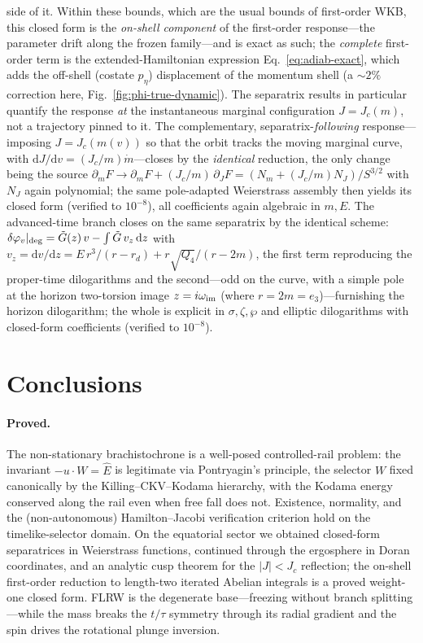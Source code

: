 \documentclass[12pt]{iopart}
\newcommand{\Ehat}{\hat E}
\newcommand{\Jc}{J_{c}}
\newcommand{\dd}{\mathrm{d}}
\begin{document}
side of it. Within these bounds, which
are the usual bounds of first-order WKB, this closed form is the \emph{on-shell
component} of the first-order response---the parameter drift along the frozen
family---and is exact as such; the \emph{complete} first-order term is the
extended-Hamiltonian expression Eq.~\eqref{eq:adiab-exact}, which adds the
off-shell (costate $p_\eta$) displacement of the momentum shell (a $\sim2\%$
correction here, Fig.~\ref{fig:phi-true-dynamic}). The separatrix
results in particular quantify the response \emph{at} the instantaneous marginal
configuration $J=\Jc(m)$, not a trajectory pinned to it. The complementary,
separatrix-\emph{following} response---imposing $J=\Jc(m(v))$ so that the orbit
tracks the moving marginal curve, with $\dd J/\dd v=(\Jc/m)\dot m$---closes by the
\emph{identical} reduction, the only change being the source $\partial_m F\to
\partial_m F+(\Jc/m)\,\partial_J F=(N_m+(\Jc/m)N_J)/S^{3/2}$ with $N_J$ again
polynomial; the same pole-adapted Weierstrass assembly then yields its closed form
(verified to $10^{-8}$), all coefficients again algebraic in $m,E$. The
advanced-time branch closes on the same separatrix by the identical scheme:
$\delta\varphi_v|_{\rm deg}=\tilde G(z)\,v-\int\tilde G\,v_z\,\dd z$ with
$v_z=\dd v/\dd z=E\,r^3/(r-r_d)+r\sqrt{Q_4}/(r-2m)$, the first term reproducing the
proper-time dilogarithms and the second---odd on the curve, with a simple pole at
the horizon two-torsion image $z=i\omega_{\rm im}$ (where $r=2m=e_3$)---furnishing the
horizon dilogarithm; the whole is explicit in $\sigma,\zeta,\wp$ and elliptic
dilogarithms with closed-form coefficients (verified to $10^{-8}$).


\section{Conclusions}
\label{sec:concl}
\paragraph{Proved.} The non-stationary brachistochrone is a well-posed controlled-rail
problem: the invariant $-u\cdot W=\Ehat$ is legitimate via Pontryagin's principle, the
selector $W$ fixed canonically by the Killing--CKV--Kodama hierarchy, with the Kodama
energy conserved along the rail even when free fall does not. Existence, normality, and
the (non-autonomous) Hamilton--Jacobi verification criterion hold on the
timelike-selector domain. On the equatorial sector we obtained closed-form separatrices
in Weierstrass functions, continued through the ergosphere in Doran coordinates, and an
analytic cusp theorem for the $|J|<\Jc$ reflection; the on-shell first-order reduction
to length-two iterated Abelian integrals is a proved weight-one closed form. FLRW is the
degenerate base---freezing without branch splitting---while the mass breaks the $t/\tau$
symmetry through its radial gradient and the spin drives the rotational plunge inversion.
\end{document}
